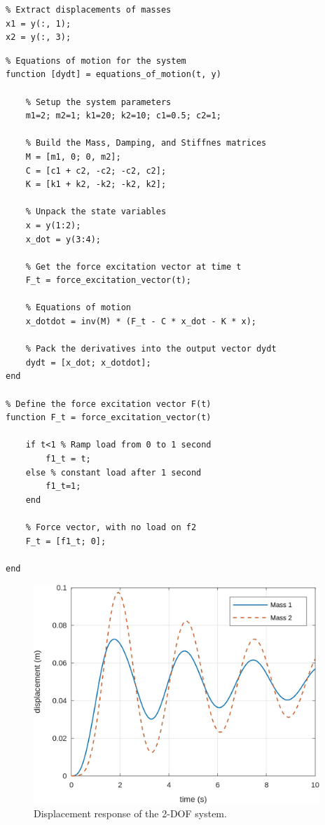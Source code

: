 \documentclass[12pt,letter]{article}
\begin{document}
\begin{example}
\begin{lstlisting}
% Extract displacements of masses
x1 = y(:, 1);
x2 = y(:, 3);
\end{lstlisting}
	
	
\begin{lstlisting}
% Equations of motion for the system
function [dydt] = equations_of_motion(t, y)

	% Setup the system parameters
	m1=2; m2=1; k1=20; k2=10; c1=0.5; c2=1;
	
	% Build the Mass, Damping, and Stiffnes matrices 
	M = [m1, 0; 0, m2];
	C = [c1 + c2, -c2; -c2, c2];
	K = [k1 + k2, -k2; -k2, k2];
	
	% Unpack the state variables
	x = y(1:2);
	x_dot = y(3:4);
	
	% Get the force excitation vector at time t
	F_t = force_excitation_vector(t);
	
	% Equations of motion
	x_dotdot = inv(M) * (F_t - C * x_dot - K * x);
	
	% Pack the derivatives into the output vector dydt
	dydt = [x_dot; x_dotdot];
end

% Define the force excitation vector F(t)
function F_t = force_excitation_vector(t)
	
	if t<1 % Ramp load from 0 to 1 second 
	    f1_t = t;
	else % constant load after 1 second 
	    f1_t=1;
	end
	
	% Force vector, with no load on f2
	F_t = [f1_t; 0]; 

end
\end{lstlisting}
	
	
\begin{figure}[H]
	\centering
	\includegraphics[width=4.25in]{../figures/ODE_results-2-DOF}
	\caption{Displacement response of the 2-DOF system.}
	\label{fig:ODE_results-2-DOF}
\end{figure}
				
	\end{example}
				
\end{document}
